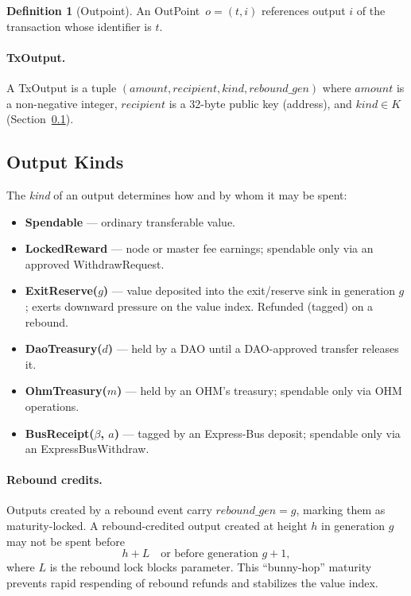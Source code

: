 \documentclass[11pt,a4paper]{article}
\theoremstyle{definition}
\newtheorem{definition}{Definition}
\newcommand{\ohm}{\textsf{OH\scriptsize M}}\newcommand{\evk}{\textsf{EVK}}
\newcommand{\outpoint}{\textsf{OutPoint}}
\newcommand{\WithdrawRequest}{\textsf{WithdrawRequest}}
\newcommand{\ExpressBusWithdraw}{\textsf{ExpressBusWithdraw}}
\begin{document}
\begin{definition}[Outpoint]
\label{def:outpoint}
An \outpoint\ $o = (t, i)$ references output $i$ of the transaction whose
identifier is $t$.
\end{definition}

\paragraph{TxOutput.} A TxOutput is a tuple $(\mathit{amount}, \mathit{recipient}, \mathit{kind}, \mathit{rebound\_gen})$
where $\mathit{amount}$ is a non-negative integer, $\mathit{recipient}$ is a
32-byte public key (address), and $\mathit{kind} \in K$ (Section~\ref{sec:output-kinds}).

\subsection{Output Kinds}
\label{sec:output-kinds}

The \emph{kind} of an output determines how and by whom it may be spent:

\begin{itemize}[leftmargin=2em]
  \item \textbf{Spendable} --- ordinary transferable value.
  \item \textbf{LockedReward} --- node or master fee earnings; spendable only
    via an approved \WithdrawRequest.
  \item \textbf{ExitReserve($g$)} --- value deposited into the exit/reserve sink
    in generation $g$; exerts downward pressure on the value index.  Refunded
    (tagged) on a rebound.
  \item \textbf{DaoTreasury($d$)} --- held by a DAO until a DAO-approved
    transfer releases it.
  \item \textbf{OhmTreasury($m$)} --- held by an \ohm{}'s treasury; spendable
    only via OHM operations.
  \item \textbf{BusReceipt($\beta$, $a$)} --- tagged by an Express-Bus deposit;
    spendable only via an \ExpressBusWithdraw.
\end{itemize}

\paragraph{Rebound credits.}
Outputs created by a rebound event carry $\mathit{rebound\_gen} = g$, marking
them as maturity-locked.  A rebound-credited output created at height $h$ in
generation $g$ may not be spent before
\[
h + L \quad\text{or before generation } g{+}1,
\]
where $L$ is the rebound lock blocks parameter.  This ``bunny-hop'' maturity
prevents rapid respending of rebound refunds and stabilizes the value index.
\end{document}
